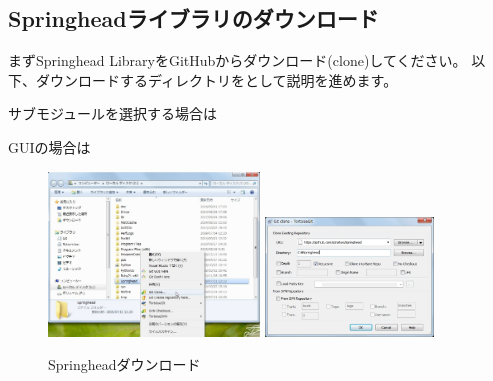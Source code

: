 \subsection{Springheadライブラリのダウンロード}
\label{subsec:Download}

\noindent
まずSpringhead LibraryをGitHubからダウンロード(clone)してください。
以下、ダウンロードするディレクトリを\SprTop{}として説明を進めます。

\medskip
\begin{narrow}[15pt]
	サブモジュールを選択する場合は

	\bigskip
	GUIの場合は
	\begin{figure}[h]
	\begin{center}
	\includegraphics[width=0.5\textwidth]{fig/SpringheadClone1.eps}
	\includegraphics[width=0.4\textwidth]{fig/SpringheadClone2.eps}
	\end{center}
	\caption{Springheadダウンロード}
	\label{fig:SpringheadClone}
	\end{figure}
\end{narrow}

